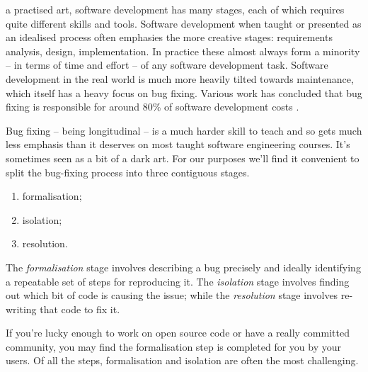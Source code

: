 \documentclass[10pt,journal,compsoc]{IEEEtran}
\begin{document}
% 
% 
% 
% 
 a practised art, software development has many stages, each of which requires quite different skills and tools. Software development when taught or presented as an idealised process often emphasies the more creative stages: requirements analysis, design, implementation. In practice these almost always form a minority -- in terms of time and effort -- of any software development task. Software development in the real world is much more heavily tilted towards maintenance, which itself has a heavy focus on bug fixing. Various work has concluded that bug fixing is responsible for around 80\% of software development costs \cite{nist2002}.

Bug fixing -- being longitudinal -- is a much harder skill to teach and so gets much less emphasis than it deserves on most taught software engineering courses. It's sometimes seen as a bit of a dark art. For our purposes we'll find it convenient to split the bug-fixing process into three contiguous stages.

\begin{enumerate}
\item formalisation;
\item isolation;
\item resolution.
\end{enumerate}

The {\it formalisation\/} stage involves describing a bug precisely and ideally identifying a repeatable set of steps for reproducing it. The {\it isolation\/} stage involves finding out which bit of code is causing the issue; while the {\it resolution\/} stage involves re-writing that code to fix it.

If you're lucky enough to work on open source code or have a really committed community, you may find the formalisation step is completed for you by your users. Of all the steps, formalisation and isolation are often the most challenging.
\end{document}
